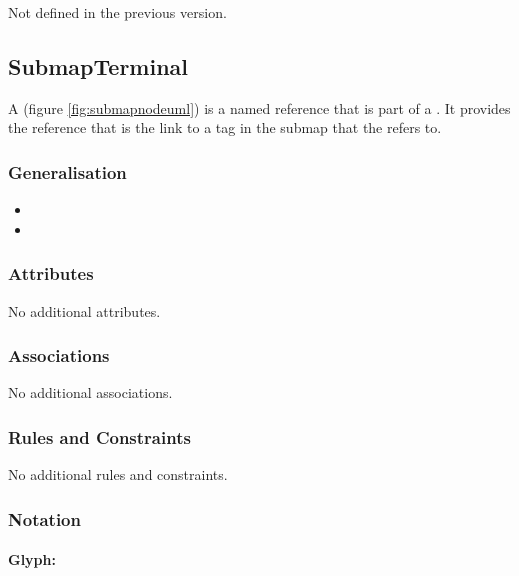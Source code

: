 Not defined in the previous version.

 \subsection{SubmapTerminal}
\label{defn:SubmapTerminal}

A  (figure \ref{fig:submapnodeuml}) is a named reference that is part of a
. It provides the reference that is the link to a
tag in the submap that the  refers to.

\subsubsection{Generalisation}

\begin{itemize}
\item {}
\item {}
\end{itemize}

\subsubsection{Attributes}

No additional attributes.

\subsubsection{Associations}

No additional associations.

\subsubsection{Rules and Constraints}

No additional rules and constraints.

\subsubsection{Notation}

\paragraph{Glyph: }

